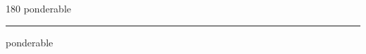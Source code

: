 
\begin{frame}
\begin{center}
\begin{turn}{180}
{\fontsize{2.5cm}{1em}\selectfont ponderable}
\end{turn}
\vspace{1em}\par  
\hrule
\vspace{1em}\par  
{\fontsize{2.5cm}{1em}\selectfont ponderable}
\end{center}
\end{frame}
